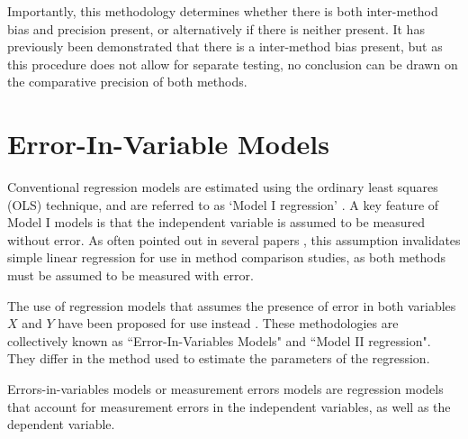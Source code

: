 \documentclass[12pt, a4paper]{report}
\theoremstyle{plain}
\theoremstyle{definition}
\theoremstyle{remark}
\begin{document}
Importantly, this methodology determines whether there is both
inter-method bias and precision present, or alternatively if there
is neither present. It has previously been demonstrated that there
is a inter-method bias present, but as this procedure does not
allow for separate testing, no conclusion can be drawn on the
comparative precision of both methods.











\section{Error-In-Variable Models}
Conventional regression models are estimated using the ordinary
least squares (OLS) technique, and are referred to as `Model I
regression' \citep{CornCoch,ludbrook97}. A key feature of Model I
models is that the independent variable is assumed to be measured
without error. As often pointed out in several papers
\citep{BA83,ludbrook97}, this assumption invalidates simple linear
regression for use in method comparison studies, as both methods
must be assumed to be measured with error.

The use of regression models that assumes the presence of error in
both variables $X$ and $Y$ have been proposed for use instead
\citep{CornCoch,ludbrook97}. These methodologies are collectively
known as ``Error-In-Variables Models" and ``Model II regression". They differ in the method used to
estimate the parameters of the regression.

Errors-in-variables models or measurement errors models are regression models that account for measurement errors in the independent variables, as well as the dependent variable.
\end{document}
